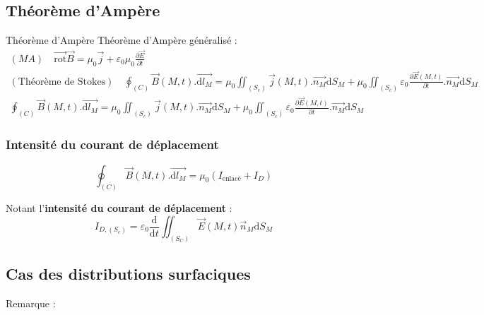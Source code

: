 \subsection{Théorème d'Ampère} %
\label{sub:Théorème d'Ampère}
\begin{Theorem}{Théorème d'Ampère}{}
Théorème d'Ampère généralisé :
\begin{gather}
  (MA) \quad \overrightarrow{\mathrm{rot}} \overrightarrow{B} = \mu_0 \overrightarrow{j} + \varepsilon_0 \mu_0 \frac{\partial \overrightarrow{E}}{\partial t}  \\ 
  (\text{Théorème de Stokes}) \quad \oint _{(C)} \overrightarrow{B} (M,t) . \overrightarrow{\mathrm{d}l_M} = \mu_0 \iint _{(S_c)} \overrightarrow{j} (M,t) . \overrightarrow{n_M} \mathrm{d} S_M + \mu_0 \iint _{(S_c)}  \varepsilon_0 \frac{\partial  \overrightarrow{E}(M,t)}{\partial t} . \overrightarrow{n_M} \mathrm{d} S_M \\ 
  \boxed{\oint _{(C)} \overrightarrow{B} (M,t) . \overrightarrow{\mathrm{d}l_M} = \mu_0 \iint _{(S_c)} \overrightarrow{j} (M,t) . \overrightarrow{n_M} \mathrm{d} S_M + \mu_0  \iint _{(S_c)} \varepsilon_0 \frac{\partial  \overrightarrow{E}(M,t)}{\partial t} . \overrightarrow{n_M} \mathrm{d} S_M }
\end{gather} 
\end{Theorem}

\subsubsection{Intensité du courant de déplacement} %
\label{sec:Intensité du courant de déplacement}
\begin{equation}
    \boxed{\oint _{(C)} \overrightarrow{B} (M,t) . \overrightarrow{\mathrm{d}l_M} = \mu_0 (I _{\text{enlacé}}+ I _{D})}
\end{equation}

Notant l'\textbf{intensité du courant de déplacement} :
\begin{equation}
  I _{D, (S_c)} = \varepsilon_0 \frac{\mathrm{d}}{\mathrm{d}t}  \iint _{(S_C)} \overrightarrow{E} (M,t) \overrightarrow{n}_M \mathrm{d} S_M
\end{equation}
\subsection{Cas des distributions surfaciques} %

Remarque : 

